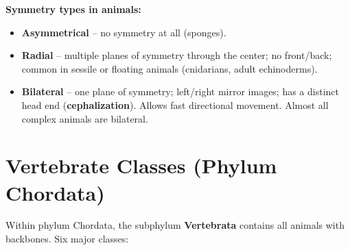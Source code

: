 \documentclass[11pt, letterpaper]{article}
\begin{document}
\begin{tcolorbox}[colback=part3bg, colframe=sectionpurple, arc=3pt, boxrule=1pt]
\textbf{Symmetry types in animals:}
\begin{itemize}[noitemsep, leftmargin=*]
  \item \textbf{Asymmetrical} -- no symmetry at all (sponges).
  \item \textbf{Radial} -- multiple planes of symmetry through the center; no front/back; common in sessile or floating animals (cnidarians, adult echinoderms).
  \item \textbf{Bilateral} -- one plane of symmetry; left/right mirror images; has a distinct head end (\textbf{cephalization}). Allows fast directional movement. Almost all complex animals are bilateral.
\end{itemize}
\end{tcolorbox}

\section*{Vertebrate Classes (Phylum Chordata)}

Within phylum Chordata, the subphylum \textbf{Vertebrata} contains all animals with backbones.
Six major classes:
\end{document}
